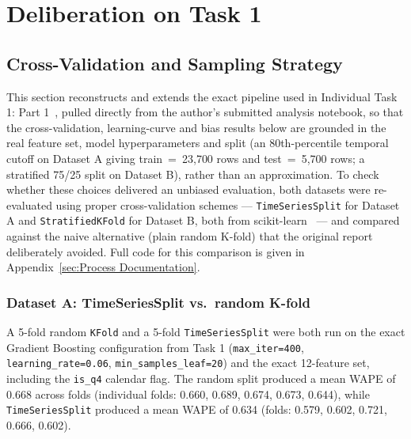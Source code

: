 \section{Deliberation on Task 1}
\label{sec:Deliberation}

\subsection{Cross-Validation and Sampling Strategy}

This section reconstructs and extends the exact pipeline used in Individual Task 1: Part
1~\cite{nataraja2026task1}, pulled directly from the author's submitted analysis notebook, so that
the cross-validation, learning-curve and bias results below are grounded in the real feature set,
model hyperparameters and split (an 80th-percentile temporal cutoff on Dataset A giving
train~=~23,700 rows and test~=~5,700 rows; a stratified 75/25 split on Dataset B), rather than an
approximation. To check whether these choices delivered an unbiased evaluation, both datasets were
re-evaluated using proper cross-validation schemes --- \texttt{TimeSeriesSplit} for Dataset A and
\texttt{StratifiedKFold} for Dataset B, both from scikit-learn~\cite{pedregosa2011scikit} --- and
compared against the naive alternative (plain random K-fold) that the original report deliberately
avoided. Full code for this comparison is given in Appendix~\ref{sec:Process Documentation}.

\subsubsection*{Dataset A: TimeSeriesSplit vs.\ random K-fold}

A 5-fold random \texttt{KFold} and a 5-fold \texttt{TimeSeriesSplit} were both run on the exact
Gradient Boosting configuration from Task 1 (\texttt{max\_iter=400}, \texttt{learning\_rate=0.06},
\texttt{min\_samples\_leaf=20}) and the exact 12-feature set, including the \texttt{is\_q4}
calendar flag. The random split produced a mean WAPE of 0.668 across folds (individual folds:
0.660, 0.689, 0.674, 0.673, 0.644), while \texttt{TimeSeriesSplit} produced a mean WAPE of 0.634
(folds: 0.579, 0.602, 0.721, 0.666, 0.602).

